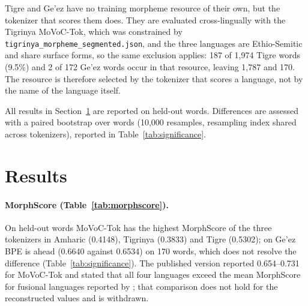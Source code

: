 \documentclass[11pt]{article}
\newcommand{\movoctok}{MoVoC-Tok}
\begin{document}
Tigre and Ge'ez have no training morpheme resource of their own, but the
tokenizer that scores them does. They are evaluated cross-lingually with the
Tigrinya \movoctok{}, which was constrained by
\texttt{tigrinya\_morpheme\_segmented.json}, and the three languages are
Ethio-Semitic and share surface forms, so the same exclusion applies: 187 of
1,974 Tigre words (9.5\%) and 2 of 172 Ge'ez words occur in that resource,
leaving 1,787 and 170. The resource is therefore selected by the tokenizer
that scores a language, not by the name of the language itself.

All results in Section~\ref{sec:results} are reported on held-out words.
Differences are assessed with a paired bootstrap over words (10,000 resamples,
resampling index shared across tokenizers), reported in
Table~\ref{tab:significance}.

\section{Results}
\label{sec:results}

\begin{table}[t]
  \centering
  \small
  \resizebox{\columnwidth}{!}{}
  \caption{MorphScore of BPE, WordPiece and \movoctok{} on the morpheme
  evaluation sets, on words held out from \movoctok{}'s training morpheme
  resource (Section~\ref{sec:heldout}; No.~Items = evaluation words). For
  Tigre and Ge'ez ($*$) the Tigrinya \movoctok{} is applied cross-lingually.}
  \label{tab:morphscore}
\end{table}

\begin{table}[t]
  \centering
  \small
  \resizebox{\columnwidth}{!}{}
  \caption{Paired bootstrap over held-out words (10,000 resamples, shared
  resampling index), \movoctok{} minus BPE. Intervals are 95\% percentile
  intervals of the difference. $*$ marks cross-lingual application of the
  Tigrinya \movoctok{}.}
  \label{tab:significance}
\end{table}

\paragraph{MorphScore (Table~\ref{tab:morphscore}).} On held-out words
\movoctok{} has the highest MorphScore of the three tokenizers in Amharic
(0.4148), Tigrinya (0.3833) and Tigre (0.5302); on Ge'ez BPE is ahead (0.6640
against 0.6534) on 170 words, which does not resolve the difference
(Table~\ref{tab:significance}). The published version reported 0.654--0.731
for \movoctok{} and stated that all four languages exceed the mean MorphScore
for fusional languages reported by \citet{arnett-bergen-2025-language}; that
comparison does not hold for the reconstructed values and is withdrawn.
\end{document}
